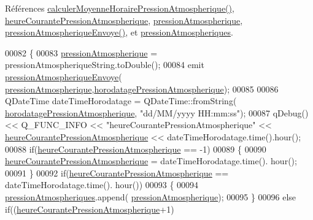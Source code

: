 Références \hyperlink{class_infos_pression_atmospherique_a287f1f24726218868c8531365c1a22ec}{calculer\+Moyenne\+Horaire\+Pression\+Atmospherique()}, \hyperlink{class_infos_pression_atmospherique_ab3fa5c89841cf03f371ef7848b8bc958}{heure\+Courante\+Pression\+Atmospherique}, \hyperlink{class_infos_pression_atmospherique_a69f31dc0d0ef59f8ced23e4663ee1ab8}{pression\+Atmospherique}, \hyperlink{class_infos_pression_atmospherique_ad5342b25c87fd5e41a89ad74b5f69c86}{pression\+Atmospherique\+Envoye()}, et \hyperlink{class_infos_pression_atmospherique_a38218b11dc9fb22aca7525f93155a26c}{pression\+Atmospheriques}.


\begin{DoxyCode}
00082 \{
00083     \hyperlink{class_infos_pression_atmospherique_a69f31dc0d0ef59f8ced23e4663ee1ab8}{pressionAtmospherique} = pressionAtmospheriqueString.toDouble();
00084     emit \hyperlink{class_infos_pression_atmospherique_ad5342b25c87fd5e41a89ad74b5f69c86}{pressionAtmospheriqueEnvoye}(
      \hyperlink{class_infos_pression_atmospherique_a69f31dc0d0ef59f8ced23e4663ee1ab8}{pressionAtmospherique},\hyperlink{class_infos_pression_atmospherique_aba207458a51a9290e4f2e0795983a44e}{horodatagePressionAtmospherique});
00085 
00086     QDateTime dateTimeHorodatage = QDateTime::fromString(
      \hyperlink{class_infos_pression_atmospherique_aba207458a51a9290e4f2e0795983a44e}{horodatagePressionAtmospherique}, \textcolor{stringliteral}{"dd/MM/yyyy HH:mm:ss"});
00087     qDebug() << Q\_FUNC\_INFO << \textcolor{stringliteral}{"heureCourantePressionAtmospherique"} << 
      \hyperlink{class_infos_pression_atmospherique_ab3fa5c89841cf03f371ef7848b8bc958}{heureCourantePressionAtmospherique} << dateTimeHorodatage.time().hour();
00088     \textcolor{keywordflow}{if}(\hyperlink{class_infos_pression_atmospherique_ab3fa5c89841cf03f371ef7848b8bc958}{heureCourantePressionAtmospherique} == -1)
00089     \{
00090         \hyperlink{class_infos_pression_atmospherique_ab3fa5c89841cf03f371ef7848b8bc958}{heureCourantePressionAtmospherique} = dateTimeHorodatage.time().
      hour();
00091     \}
00092     \textcolor{keywordflow}{if}(\hyperlink{class_infos_pression_atmospherique_ab3fa5c89841cf03f371ef7848b8bc958}{heureCourantePressionAtmospherique} == dateTimeHorodatage.time().
      hour())
00093     \{
00094         \hyperlink{class_infos_pression_atmospherique_a38218b11dc9fb22aca7525f93155a26c}{pressionAtmospheriques}.append(
      \hyperlink{class_infos_pression_atmospherique_a69f31dc0d0ef59f8ced23e4663ee1ab8}{pressionAtmospherique});
00095     \}
00096     \textcolor{keywordflow}{else} \textcolor{keywordflow}{if}((\hyperlink{class_infos_pression_atmospherique_ab3fa5c89841cf03f371ef7848b8bc958}{heureCourantePressionAtmospherique}+1)%

\end{DoxyCode}
